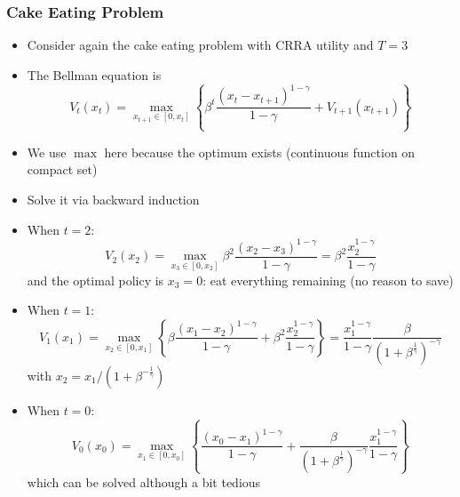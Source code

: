 \documentclass[9pt,aspectratio=169]{beamer}
\begin{document}
\begin{frame}[allowframebreaks]
    \frametitle{Cake Eating Problem}
    \begin{itemize}
        \item Consider again the cake eating problem with CRRA utility and $T
        = 3$
        \item The Bellman equation is
        \begin{equation*}
            V_t(x_t) = \max_{x_{t+1} \in [0, x_t]} \left\{ \beta^t\frac{(x_t -
                  x_{t+1})^{1-\gamma}}{1-\gamma} + V_{t+1}(x_{t+1})
            \right\}
        \end{equation*}
        \item We use $\max$ here because the optimum exists (continuous
        function on compact set)
        \item Solve it via backward induction
    \end{itemize}
    \framebreak
    \begin{itemize}
        \item When $t = 2$:
        \begin{equation*}
            V_2(x_2) = \max_{x_3 \in [0, x_2]} \beta^2\frac{(x_2 -
              x_3)^{1-\gamma}}{1-\gamma} = \beta^2 \frac{x_2^{1-\gamma}}{1-\gamma}
        \end{equation*}
        and the optimal policy is $x_3 = 0$: eat everything remaining (no
        reason to save)
        \item When $t = 1$:
        \begin{equation*}
            V_1(x_1) = \max_{x_2 \in [0, x_1]}\left\{\beta \frac{(x_1 -
                  x_2)^{1-\gamma}}{1-\gamma} + \beta^2
                \frac{x_2^{1-\gamma}}{1-\gamma} \right\} =
            \frac{x_1^{1-\gamma}}{1-\gamma} \frac{\beta}{(1 +
              \beta^{\frac{1}{\gamma}})^{-\gamma}}
        \end{equation*}
        with $x_2 = x_1/(1 + \beta^{-\frac{1}{\gamma}})$
        \item When $t = 0$:
        \begin{equation*}
            V_0(x_0) = \max_{x_1 \in [0, x_0]}\left\{ \frac{(x_0 -
                  x_1)^{1-\gamma}}{1-\gamma} + \frac{\beta}{(1 +
                  \beta^{\frac{1}{\gamma}})^{-\gamma}}
                \frac{x_1^{1-\gamma}}{1-\gamma} \right\}
        \end{equation*}
        which can be solved although a bit tedious
    \end{itemize}
\end{frame}
\end{document}
